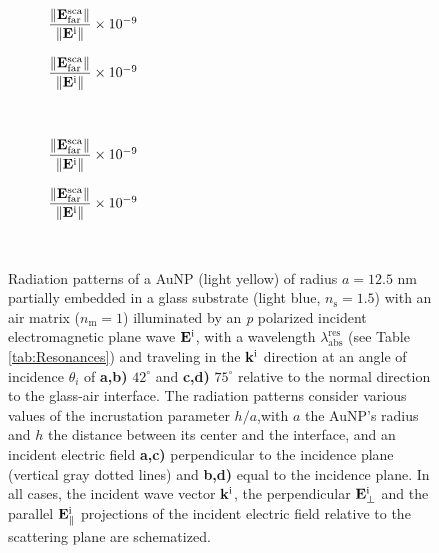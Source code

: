 \begin{figure}[b!]
    \centering
    \def\svgwidth{.8\textwidth}
    \\[-16.7em]
    \hspace*{-.2\textwidth}%
        \begin{subfigure}{.4\textwidth}\caption{%
                    \footnotesize$\dfrac{\norm{\vb{E}^\text{sca}_\text{far}}}{\norm{\vb{E}^\text{i}}} \times 10^{-9}$  }\label{sfig:Far:Inc:p2:a}\end{subfigure}%
        \begin{subfigure}{.4\textwidth}\caption{%
                    \footnotesize$\dfrac{\norm{\vb{E}^\text{sca}_\text{far}}}{\norm{\vb{E}^\text{i}}} \times 10^{-9}$  }\label{sfig:Far:Inc:p2:b}\end{subfigure}\\[13.75em]
    \def\svgwidth{.8\textwidth}
    \hspace*{-.21\textwidth}%
    \vspace*{-.7em}%
        \begin{subfigure}{.4\textwidth}\caption{%
                    \footnotesize$\dfrac{\norm{\vb{E}^\text{sca}_\text{far}}}{\norm{\vb{E}^\text{i}}} \times 10^{-9}$  }\label{sfig:Far:Inc:p2:c}\end{subfigure}%
        \begin{subfigure}{.4\textwidth}\caption{%
                    \footnotesize$\dfrac{\norm{\vb{E}^\text{sca}_\text{far}}}{\norm{\vb{E}^\text{i}}} \times 10^{-9}$  }\label{sfig:Far:Inc:p2:d}\end{subfigure}\\
    \caption[  Radiation pattern of a AuNP supported on a substrate illuminated at oblique incidence ]{
    Radiation patterns of a AuNP (light yellow) of radius $a = 12.5$ nm partially embedded in a glass substrate (light blue, $n_\text{s} = 1.5$) with an air matrix ($n_\text{m} = 1$) illuminated by an \textit{p} polarized incident electromagnetic plane wave $\vb{E}^\text{i}$, with a wavelength $\lambda_\text{abs}^\text{res}$ (see Table \ref{tab:Resonances}) and traveling in the $\vb{k}^\text{i}$ direction at an angle of incidence $\theta_i$ of \textbf{a,b)} $42^\circ$ and \textbf{c,d)} $75^\circ$ relative to the normal direction to the glass-air interface. The radiation patterns consider various values of the incrustation parameter $h/a$,with $a$ the AuNP's radius and $h$ the distance between its center and the interface, and an  incident electric field \textbf{a,c)} perpendicular to the incidence plane (vertical gray dotted lines) and \textbf{b,d)} equal to the incidence plane. In all cases, the incident wave vector $\vb{k}^\text{i}$, the perpendicular $\vb{E}_\perp^\text{i}$ and the  parallel $\vb{E}_\parallel^\text{i}$ projections of the incident electric field relative to the scattering plane are schematized.%
    }
    \label{fig:Far:Inc:p2}
\end{figure}

